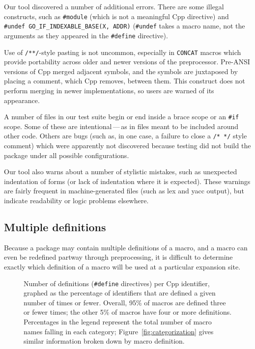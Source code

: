 \documentclass[10pt]{article}
\newcommand{\captionsmall}[1]{\caption[]{\small #1}}
\begin{document}
Our tool discovered a number of additional
errors.  There are some illegal constructs, such as {\tt \#module} (which
is not a meaningful Cpp directive) and {\tt \#undef
\verb|GO_IF_INDEXABLE_BASE|(X, ADDR)} ({\tt \#undef} takes a macro name,
not the arguments as they appeared in the {\tt \#define} directive).
  
Use of {\tt /**/}-style pasting is not uncommon, especially in {\tt CONCAT}
macros which provide portability across older and newer versions of the
preprocessor.  Pre-ANSI versions of Cpp merged adjacent symbols, and the
symbols are juxtaposed by placing a comment, which Cpp removes, between
them.  This construct does not perform merging in newer implementations,
so users are warned of its appearance.

A number of files in our test suite begin or end inside a brace scope or an
{\tt \#if} scope.  Some of these are intentional\,---\,as in files meant
to be included around other code.  Others are bugs (such as, in one case, a
failure to close a {\tt /* */} style comment) which were apparently not
discovered because testing did not build the package under all possible
configurations.

Our tool also warns about a number of stylistic mistakes, such as
unexpected indentation of forms (or lack of indentation where it is
expected).  These warnings are fairly frequent in machine-generated files
(such as lex and yacc output), but indicate readability or logic problems
elsewhere.


\subsection{Multiple definitions}
\label{sec:mult-def}

Because a package may contain multiple definitions of a macro, and a macro
can even be redefined partway through preprocessing, it is difficult to
determine exactly which definition of a macro will be used at a particular
expansion site.

\begin{figure}
\centerline{}
\captionsmall{Number of definitions ({\tt \#define} directives) per Cpp
  identifier, graphed as the percentage of identifiers that are defined a
  given number of times or fewer.  Overall, 95\% of macros are defined
  three or fewer times; the other 5\% of macros have four or more
  definitions.  Percentages in the legend represent the total number of
  macro names falling in each category; Figure~\ref{fig:categorization}
  gives similar information broken down by macro definition.}
\label{fig:freq-def-cat}
\end{figure}
\end{document}
